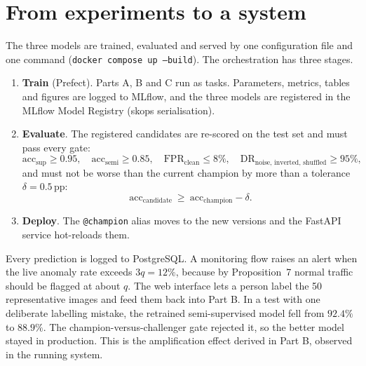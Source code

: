 \documentclass[11pt,a4paper]{article}
\begin{document}
\section{From experiments to a system}\label{sec:system}
The three models are trained, evaluated and served by one configuration file and one command
(\texttt{docker compose up --build}). The orchestration has three stages.
\begin{enumerate}[leftmargin=1.4em]
  \item \textbf{Train} (Prefect). Parts A, B and C run as tasks. Parameters, metrics, tables and figures are logged
        to MLflow, and the three models are registered in the MLflow Model Registry (skops serialisation).
  \item \textbf{Evaluate}. The registered candidates are re-scored on the test set and must pass every gate:
  \begin{equation}
    \text{acc}_{\text{sup}}\ge0.95,\quad \text{acc}_{\text{semi}}\ge0.85,\quad
    \text{FPR}_{\text{clean}}\le8\%,\quad \text{DR}_{\text{noise, inverted, shuffled}}\ge95\%,
  \end{equation}
  and must not be worse than the current champion by more than a tolerance $\delta=0.5$\,pp:
  \begin{equation}
    \text{acc}_{\text{candidate}}\ \ge\ \text{acc}_{\text{champion}}-\delta .
  \end{equation}
  \item \textbf{Deploy}. The \texttt{@champion} alias moves to the new versions and the FastAPI service hot-reloads
        them.
\end{enumerate}
Every prediction is logged to PostgreSQL. A monitoring flow raises an alert when the live anomaly rate exceeds
$3q=12\%$, because by Proposition~7 normal traffic should be flagged at about $q$. The web interface lets a person
label the 50 representative images and feed them back into Part B. In a test with one deliberate labelling mistake,
the retrained semi-supervised model fell from $92.4\%$ to $88.9\%$. The champion-versus-challenger gate rejected
it, so the better model stayed in production. This is the amplification effect derived in Part B, observed in the
running system.

\end{document}
